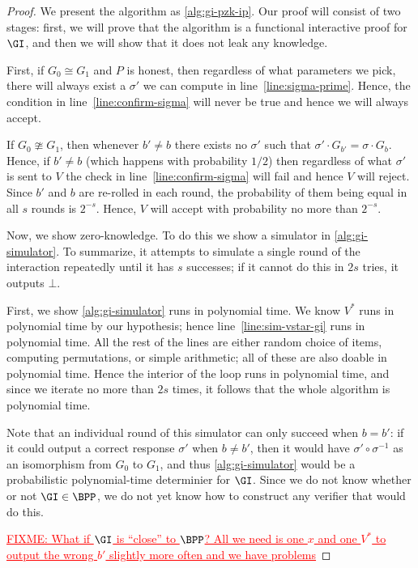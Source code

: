 \documentclass[english,12pt]{reedthesis}
\theoremstyle{plain}
\theoremstyle{definition}
\theoremstyle{remark}
\newcommand{\FIXME}[1]{\textcolor{red}{\ul{FIXME: #1}}}
\begin{document}
\begin{proof}
  We present the algorithm as \cref{alg:gi-pzk-ip}. Our proof will consist of
  two stages: first, we will prove that the algorithm is a functional
  interactive proof for $\GI$, and then we will show that it does not leak any
  knowledge.

  First, if $G_{0} \cong G_{1}$ and $P$ is honest, then regardless of what
  parameters we pick, there will always exist a $\sigma'$ we can compute in
  line~\ref{line:sigma-prime}. Hence, the condition in
  line~\ref{line:confirm-sigma} will never be true and hence we will always
  accept.

  If $G_{0} \ncong G_{1}$, then whenever $b' \ne b$ there exists no $\sigma'$ such that
  $\sigma' \cdot G_{b'} = \sigma \cdot G_{b}$. Hence, if $b' \ne b$ (which happens with probability
  $1/2$) then regardless of what $\sigma'$ is sent to $V$ the check in
  line~\ref{line:confirm-sigma} will fail and hence $V$ will reject. Since $b'$
  and $b$ are re-rolled in each round, the probability of them being equal in
  all $s$ rounds is $2^{-s}$. Hence, $V$ will accept with probability no more
  than $2^{-s}$.

  Now, we show zero-knowledge. To do this we show a simulator in
  \cref{alg:gi-simulator}. To summarize, it attempts to simulate a single round
  of the interaction repeatedly until it has $s$ successes; if it cannot do this
  in $2s$ tries, it outputs $\bot$.

  First, we show \cref{alg:gi-simulator} runs in polynomial time. We know
  $V^{*}$ runs in polynomial time by our hypothesis; hence
  line~\ref{line:sim-vstar-gi} runs in polynomial time. All the rest of the
  lines are either random choice of items, computing permutations, or simple
  arithmetic; all of these are also doable in polynomial time. Hence the
  interior of the loop runs in polynomial time, and since we iterate no more
  than $2s$ times, it follows that the whole algorithm is polynomial time.

  Note that an individual round of this simulator can only succeed when
  $b = b'$: if it could output a correct response $\sigma'$ when $b \ne b'$, then it
  would have $\sigma' \circ \sigma^{-1}$ as an isomorphism from $G_{0}$ to $G_{1}$, and thus
  \cref{alg:gi-simulator} would be a probabilistic polynomial-time determinier
  for $\GI$. Since we do not know whether or not $\GI \in \BPP$, we do not yet
  know how to construct any verifier that would do this.

  \FIXME{What if $\GI$ is ``close'' to $\BPP$? All we need is one $x$ and one
    $V^{*}$ to output the wrong $b'$ slightly more often and we have problems}


\end{proof}
\end{document}
